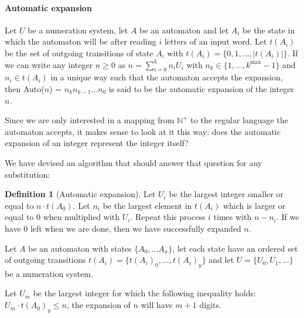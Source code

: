 \documentclass{article}
\theoremstyle{definition}
\newtheorem{definition}[theorem]{Definition}
\begin{document}
\paragraph{Automatic expansion}
Let $U$ be a numeration system, let $A$ be an automaton and let $A_i$ be 
the state in which the automaton will be after reading $i$ letters of an 
input word. Let $t(A_i)$ be the set of outgoing transitions of state $A_i$
with $t(A_i) = \{0, 1, \ldots, |t(A_i)|\}$.
If we can write any integer $n \ge 0$ as 
$n = \sum_{i = 0}^k n_i U_i$ with 
$n_k \in \{1, \ldots, k^\mathrm{max} - 1\}$ and $n_i \in t(A_i)$ in a 
unique way such that the automaton accepts the expansion, then Auto($n$) = 
$n_k n_{k - 1} \ldots n_0$ is said to be the automatic expansion of the 
integer $n$.

Since we are only interested in a mapping from $\mathbb{N}^+$ to the regular
language the automaton accepts, it makes sense to look at it this way: does
the automatic expansion of an integer represent the integer itself?

We have devised an algorithm that should answer that question for any
substitution:

\begin{definition}[Automatic expansion] \label{def:autoexpand}
Let $U_i$ be the largest integer smaller or equal to $n \cdot t(A_0)$. Let 
$n_i$ be the largest element in $t(A_i)$ which is larger or equal to 0 when 
multiplied with $U_i$. Repeat this process $i$ times with $n - n_i$. If we have
0 left when we are done, then we have successfully expanded $n$.

Let $A$ be an automaton with states $\{A_0, \ldots A_x\}$, let each state have 
an ordered set of outgoing transitions 
$t(A_i) = \{t(A_i)_0, \ldots, t(A_i)_y\}$ and let $U = \{U_0, U_1, \ldots\}$ be
a numeration system.

Let $U_m$ be the largest integer for which the following inequality holds:
$U_m \cdot t(A_0)_y \le n$, the expansion of $n$ will have $m + 1$ digits.


\end{definition}
\end{document}
